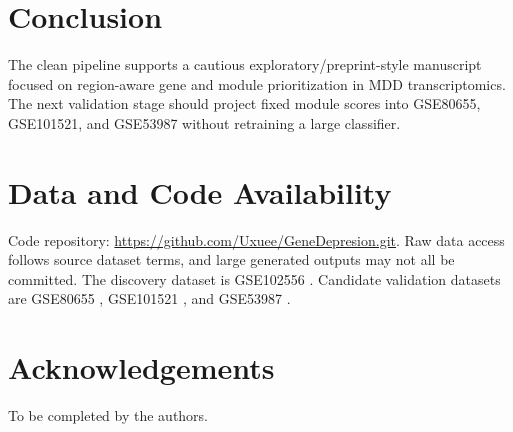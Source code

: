 \documentclass[11pt]{article}
\begin{document}
\section{Conclusion}

The clean pipeline supports a cautious exploratory/preprint-style manuscript focused on region-aware gene and module prioritization in MDD transcriptomics. The next validation stage should project fixed module scores into GSE80655, GSE101521, and GSE53987 without retraining a large classifier.

\section{Data and Code Availability}

Code repository: \url{https://github.com/Uxuee/GeneDepresion.git}. Raw data access follows source dataset terms, and large generated outputs may not all be committed. The discovery dataset is GSE102556 \citep{Labonte2017}. Candidate validation datasets are GSE80655 \citep{Ramaker2017}, GSE101521 \citep{Pantazatos2017}, and GSE53987 \citep{Lanz2019}.

\section{Acknowledgements}

To be completed by the authors.



\end{document}
